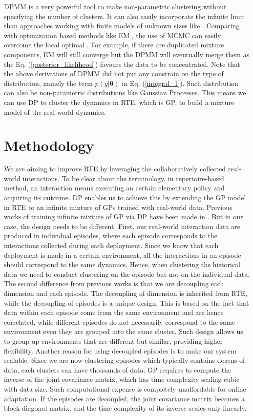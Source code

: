 \documentclass[journal]{IEEEtran}
\begin{document}
DPMM is a very powerful tool to make non-parametric clustering without specifying the number of clusters. 
It can also easily incorporate the infinite limit than approaches working with finite models of unknown sizes like \cite{Bayesian_mixture}.
Comparing with optimization based methods like EM \cite{EM}, the use of MCMC can easily overcome the local optimal \cite{infinite_GMM}. 
For example, if there are duplicated mixture components, EM will still converge but the DPMM will eventually merge them as the Eq. (\ref{posterior_likelihood}) favours the data to be concentrated. 
Note that the above derivations of DPMM did not put any constrain on the type of distribution, namely the term $p(y|\bm{\theta})$ in Eq. (\ref{integral_1}). Such distribution can also be non-parametric distributions like Gaussian Processes. 
This means we can use DP to cluster the dynamics in RTE, which is GP, to build a mixture model of the real-world dynamics.



\section{Methodology}
We are aiming to improve RTE by leveraging the collaboratively collected real-world interactions.
To be clear about the terminology, in repertoire-based method, an interaction means executing an certain elementary policy and acquiring its outcome.
DP enables us to achieve this by extending the GP model in RTE to an infinite mixture of GPs trained with real-world data.
Previous works of training infinite mixture of GP via DP have been made in \cite{infinite_MGP, variational_MGP}. 
But in our case, the design needs to be different.
First, our real-world interaction data are produced in individual episodes, where each episode corresponds to the interactions collected during each deployment.
Since we know that each deployment is made in a certain environment, all the interactions in an episode should correspond to the same dynamics. 
Hence, when clustering the historical data we need to conduct clustering on the episode but not on the individual data. 
The second difference from previous works is that we are decoupling each dimension and each episode.
The decoupling of dimension is inherited from RTE, while the decoupling of episodes is a unique design.
This is based on the fact that data within each episode come from the same environment and are hence correlated, while different episodes do not necessarily correspond to the same environment even they are grouped into the same cluster.
Such design allows us to group up environments that are different but similar, providing higher flexibility.
Another reason for using decoupled episodes is to make our system scalable.
Since we are now clustering episodes which typically contains dozens of data, each clusters can have thousands of data.
GP requires to compute the inverse of the joint covariance matrix, which has time complexity scaling cubic with data size.
Such computational expense is completely unaffordable for online adaptation. 
If the episodes are decoupled, the joint covariance matrix becomes a block diagonal matrix, and the time complexity of its inverse scales only linearly.
\end{document}
